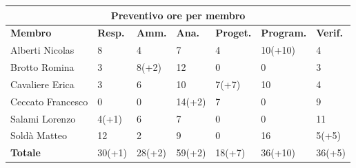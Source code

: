 \documentclass[a4paper, 12pt]{article}
\begin{document}
\begin{center}
	\begin{tabularx}{\textwidth}{|X|X|X|X|X|X|X|}
		\hline
		\multicolumn{7}{|c|}{\textbf{Preventivo ore per membro}}                                            \\
		\hline
		\hline
		\textbf{Membro}   & \textbf{Resp.}    & \textbf{Amm.}   & \textbf{Ana.} &
		\textbf{Proget.}  & \textbf{Program.} & \textbf{Verif.}                                             \\
		\hline
		Alberti Nicolas   & 8                 & 4               & 7             & 4      & 10(+10) & 4      \\
		\hline
		Brotto Romina     & 3                 & 8(+2)           & 12            & 0      & 0       & 3      \\
		\hline
		Cavaliere Erica   & 3                 & 6               & 10            & 7(+7)  & 10      & 4      \\
		\hline
		Ceccato Francesco & 0                 & 0               & 14(+2)        & 7      & 0       & 9      \\
		\hline
		Salami Lorenzo    & 4(+1)             & 6               & 7             & 0      & 0       & 11     \\
		\hline
		Soldà Matteo      & 12                & 2               & 9             & 0      & 16      & 5(+5)  \\
		\hline
		\hline
		\textbf{Totale}   & 30(+1)            & 28(+2)          & 59(+2)        & 18(+7) & 36(+10) & 36(+5) \\
		\hline
	\end{tabularx}\\[8pt]
	\mbox{}\\
\end{center}

\newpage
\end{document}
